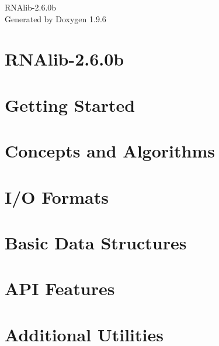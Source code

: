 \documentclass[twoside]{book}
\newcommand{\+}{\discretionary{\mbox{\scriptsize$\hookleftarrow$}}{}{}}
\newcommand{\clearemptydoublepage}{%
    \newpage{\pagestyle{empty}\cleardoublepage}%
  }
\begin{document}
  \raggedbottom
    \hypersetup{pageanchor=false,
                bookmarksnumbered=true,
                pdfencoding=unicode
               }
  \begin{titlepage}
  \vspace*{7cm}
  \begin{center}%
  {\Large RNAlib-\/2.\+6.\+0b}\\
  \vspace*{1cm}
  {\large Generated by Doxygen 1.9.6}\\
  \end{center}
  \end{titlepage}
  \clearemptydoublepage
  \tableofcontents
  \clearemptydoublepage
  \hypersetup{pageanchor=true}
\chapter{RNAlib-\/2.6.0b}
\label{index}\hypertarget{index}{}
\chapter{Getting Started}
\label{getting_started}

\chapter{Concepts and Algorithms}
\label{concepts}

\chapter{I/O Formats}
\label{io}

\chapter{Basic Data Structures}
\label{data_structures}

\chapter{API Features}
\label{api_features}

\chapter{Additional Utilities}
\label{utilities}

\end{document}
